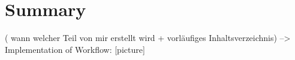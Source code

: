 \section{Summary}
 ( wann welcher Teil von mir erstellt wird + vorläufiges Inhaltsverzeichnis) --> Implementation of Workflow: [picture]
